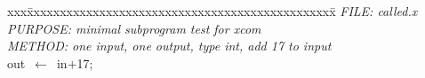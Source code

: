 \documentclass{report}
\begin{document}
\pagestyle{empty}
\begin{tabbing}
xxx\=xxxxxxxxxxxxxxxxxxxxxxxxxxxxxxxxxxxxxxxxxxxxxxx\=\kill
{\tt{}}{\em{} FILE:    called.x
}\\
{\tt{}}{\em{} PURPOSE: minimal subprogram test for xcom
}\\
{\tt{}}{\em{} METHOD:  one input, one output, type int, add 17 to input
}\\
out\ $\leftarrow$\ in$+$17;\\
\end{tabbing}
\end{document}
